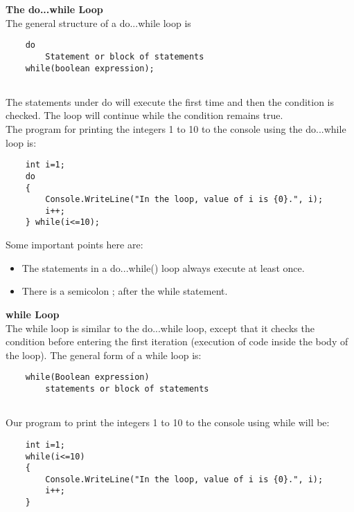 \textbf{The do...while Loop}\\

The general structure of a do...while loop is

\begin{lstlisting}
    do
        Statement or block of statements
    while(boolean expression);
        
\end{lstlisting}

The statements under do will execute the first time and then the condition is checked. The loop will continue while
the condition remains true.\\

The program for printing the integers 1 to 10 to the console using the do...while loop is:

\begin{lstlisting}
    int i=1;
    do
    {
        Console.WriteLine("In the loop, value of i is {0}.", i);
        i++;
    } while(i<=10);
\end{lstlisting}

Some important points here are:

\begin{itemize}
    \item The statements in a do...while() loop always execute at least once.
    \item There is a semicolon ; after the while statement.
\end{itemize}

\textbf{while Loop}\\

The while loop is similar to the do...while loop, except that it checks the condition before entering the first iteration
(execution of code inside the body of the loop). The general form of a while loop is:

\begin{lstlisting}
    while(Boolean expression)
        statements or block of statements
        
\end{lstlisting}

Our program to print the integers 1 to 10 to the console using while will be:

\begin{lstlisting}
    int i=1;
    while(i<=10)
    {
        Console.WriteLine("In the loop, value of i is {0}.", i);
        i++;
    }        
\end{lstlisting}


